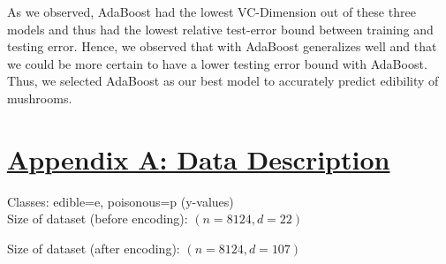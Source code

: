 \documentclass[fleqn]{article}
\begin{document}
    As we observed, AdaBoost had the lowest VC-Dimension out of these three models and thus had the lowest relative test-error bound between training and testing error. Hence, we observed that with AdaBoost generalizes well and that we could be more certain to have a lower testing error bound with AdaBoost. Thus, we selected AdaBoost as our best model to accurately predict edibility of mushrooms.

    \newpage
    \section*{\underline{Appendix A: Data Description}}
    Classes: edible=e, poisonous=p (y-values)\\

    Size of dataset (before encoding): $ (n=8124, d=22) $

    Size of dataset (after encoding): $ (n=8124, d=107) $
\end{document}
